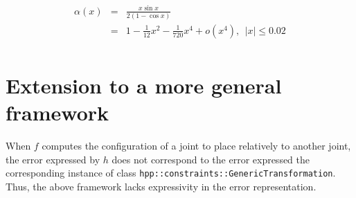 \documentclass {article}
\begin{document}
\begin{eqnarray*}
\alpha (x) &=& \frac{x\sin x}{2(1-\cos x)} \\
&=& 1 - \frac{1}{12}x^2 -\frac{1}{720} x^4 + o(x^4),\ \ |x| \leq 0.02\\
\end{eqnarray*}

\section {Extension to a more general framework}

When $f$ computes the configuration of a joint to place relatively to another joint,
the error expressed by $h$ does not correspond to the error expressed the corresponding
instance of class \texttt{hpp::constraints::GenericTransformation}.
Thus, the above framework lacks expressivity in the error representation.
\end{document}

